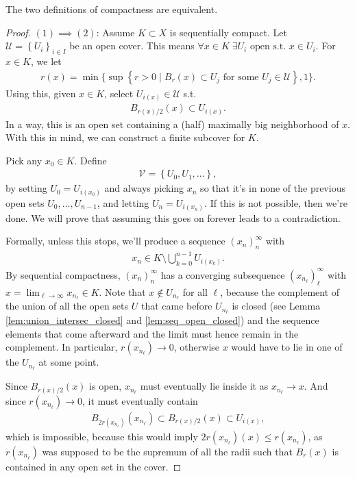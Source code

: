 \begin{prop}[Compactness]\label{prop:compactness}
	The two definitions of compactness are equivalent.
\end{prop}
\begin{proof}
	$(1) \implies (2)$: Assume $K \subset X$ is sequentially compact. Let $\mathcal{U} = \left\{ U_{i} \right\}_{i \in I}$ be an open cover. This means $\forall x \in K \; \exists U_{i} \text{ open s.t. } x \in U_{i}$. For $x \in K$, we let 
	\begin{align*}
		r(x) = \min\Big\{ \sup \left\{ r > 0 \mid B_{r}(x) \subset U_{j} \text{ for some } U_{j} \in \mathcal{U} \right\}, 1 \Big\}.
	\end{align*}
	Using this, given $x \in K$, select $U_{i(x)} \in \mathcal{U}$ s.t.
	\begin{align*}
		B_{r(x) / 2}(x) \subset U_{i(x)}.
	\end{align*}
	In a way, this is an open set containing a (half) maximally big neighborhood of $x$. With this in mind, we can construct a finite subcover for $K$.

	Pick any $x_{0} \in K$. Define
	\begin{align*}
		\mathcal{V} = \left\{ U_{0}, U_{1}, \dots \right\},
	\end{align*}
	by setting $U_{0} = U_{i(x_{0})}$ and always picking $x_{n}$ so that it's in none of the previous open sets $U_{0}, \dots, U_{n-1}$, and letting $U_{n} = U_{i(x_{n})}$. If this is not possible, then we're done. We will prove that assuming this goes on forever leads to a contradiction.

	Formally, unless this stops, we'll produce a sequence $(x_{n})_{n}^{\infty}$ with 
	\begin{align*}
		x_{n} \in K \setminus \bigcup_{k=0}^{n-1} U_{i(x_{k})}.
	\end{align*}
	By sequential compactness, $(x_{n})_{n}^{\infty}$ has a converging subsequence $(x_{n_{\ell}})_{\ell}^{\infty}$ with $x = \lim_{\ell \to \infty} x_{n_{\ell}} \in K$. Note that $x \not  \in U_{n_{\ell}}$ for all $\ell$, because the complement of the union of all the open sets $U$ that came before $U_{n_{\ell}}$ is closed (see Lemma \ref{lem:union_intersec_closed} and \ref{lem:seq_open_closed}) and the sequence elements that come afterward and the limit must hence remain in the complement. In particular, $r(x_{n_{\ell}}) \to 0$, otherwise $x$ would have to lie in one of the $U_{n_{\ell}}$ at some point.
    
    Since $B_{r(x) / 2}(x)$ is open, $x_{n_{\ell}}$ must eventually lie inside it as $x_{n_{\ell}} \to x$. And since $r(x_{n_{\ell}}) \to 0$, it must eventually contain
    \begin{align*}
        B_{2r\left( x_{n_{\ell}} \right) }(x_{n_{\ell}}) \subset B_{r(x) / 2}(x) \subset U_{i(x)},
    \end{align*}
    which is impossible, because this would imply $2r(x_{n_{\ell}})(x) \leq r(x_{n_{\ell}})$, as $r(x_{n_{\ell}})$ was supposed to be the supremum of all the radii such that $B_{r}(x)$ is contained in any open set in the cover.


\end{proof}
